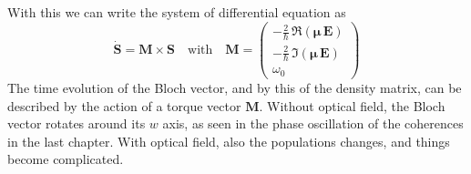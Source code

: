 With this we can write the system of differential equation as 
\[
 \dot{\boldsymbol{S}} = \boldsymbol{M}   \times \boldsymbol{S} 
 \quad \text{with} \quad 
 \boldsymbol{M}  = 
 \begin{pmatrix}
 -\frac{2}{\hbar} \, \Re ( \boldsymbol{\mu} \, \boldsymbol{E} ) \\
 - \frac{2}{\hbar} \, \Im ( \boldsymbol{\mu} \, \boldsymbol{E} ) \\
  \omega_0
 \end{pmatrix}
\]
The time evolution of the Bloch vector, and by this of the density matrix, can be described by the action of a torque vector $\boldsymbol{M}$. Without optical field, the Bloch vector rotates around its $w$ axis, as seen in the phase oscillation of the coherences in the last chapter. With optical field, also the populations changes, and things become complicated.

